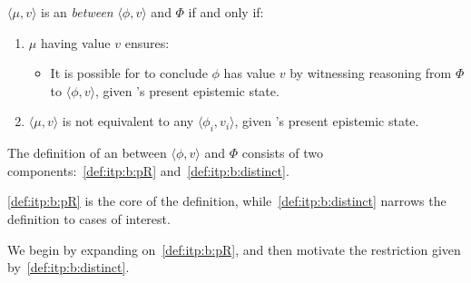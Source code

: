 \begin{note}
  \begin{definition}
    \label{def:itp:b}
    \(\langle \mu,v \rangle\) is an \itp{} \emph{between} \(\langle \phi,v \rangle\) and \(\Phi\) if and only if:

    \begin{enumerate}[label=\arabic*., ref=\named{\textsf{I.b}:\arabic*}]
    \item
      \label{def:itp:b:pR}
      \(\mu\) having value \(v\) ensures:
      \begin{itemize}
      \item
        It is possible for \vAgent{} to conclude \(\phi\) has value \(v\) by witnessing reasoning from \(\Phi\) to \(\langle \phi,v \rangle\), given \vAgent{}'s present epistemic state.
      \end{itemize}
    \item
      \label{def:itp:b:distinct}
      \(\langle \mu,v \rangle\) is not equivalent to any \(\langle \phi_{i},v_{i} \rangle\), given \vAgent{}'s present epistemic state.
    \end{enumerate}
    \vspace{-\baselineskip}
  \end{definition}
\end{note}

\begin{note}[Plan]
  The definition of an \itp{} between \(\langle \phi,v \rangle\) and \(\Phi\) consists of two components:~\ref{def:itp:b:pR} and~\ref{def:itp:b:distinct}.

  \ref{def:itp:b:pR} is the core of the definition, while~\ref{def:itp:b:distinct} narrows the definition to cases of interest.

  We begin by expanding on~\ref{def:itp:b:pR}, and then motivate the restriction given by~\ref{def:itp:b:distinct}.
\end{note}

